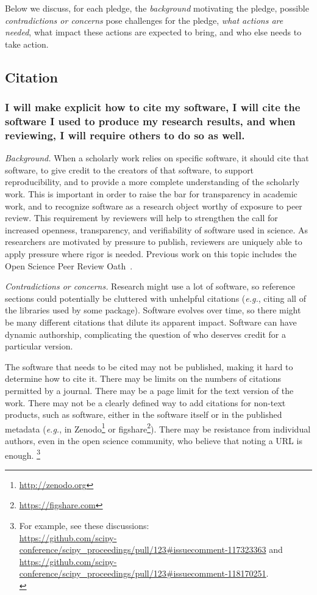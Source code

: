 \documentclass[a4paper,UKenglish]{dagman}
\renewcommand{\paragraph}[1]{\subsubsection*{#1}\xspace}
\newcommand{\eg}{\emph{e.g.},\xspace}
\begin{document}
Below we discuss, for each pledge, the \emph{background} motivating the pledge, possible \emph{contradictions or concerns} pose challenges for the pledge, \emph{what actions are needed}, what impact these actions are expected to bring, and who else needs to take action.


\subsection*{Citation}

\paragraph{I will make explicit how to cite my software, I will cite the software I used to produce my research results, and when reviewing, I will require others to do so as well.}

\emph{Background.} When a scholarly work relies on specific software, it should cite that software, to give credit to the creators of that software, to support reproducibility, and to provide a more complete understanding of the scholarly work.
This is important in order to raise the bar for transparency in academic work, and to recognize software as a research object worthy of exposure to peer review. This requirement by reviewers will help to strengthen the call for increased openness, transparency, and verifiability of software used in science. As researchers are motivated by pressure to publish, reviewers are uniquely able to apply pressure where rigor is needed. Previous work on this topic includes the Open Science Peer Review Oath~\cite{aleksic_open_2015}.

\emph{Contradictions or concerns.}
Research might use a lot of software, so reference sections could potentially be cluttered with unhelpful citations (\eg citing all of the libraries used by some package). 
Software evolves over time, so there might be many different citations that dilute its apparent impact. 
Software can have dynamic authorship, complicating the question of who deserves credit for a particular version. 

The software that needs to be cited may not be published, making it hard to determine how to cite it.  There may be limits on the numbers of citations permitted by a journal.  There may be a page limit for the text version of the work.  There may not be a clearly defined way to add citations for non-text products, such as software, either in the software itself or in the published metadata (\eg in Zenodo\footnote{\url{http://zenodo.org}} or figshare\footnote{\url{https://figshare.com}}).
There may be resistance from individual authors, even in the open science community, who believe that noting a URL is enough.%
\footnote{For example, see these discussions:\\
\url{https://github.com/scipy-conference/scipy_proceedings/pull/123\#issuecomment-117323363} and\\
\url{https://github.com/scipy-conference/scipy_proceedings/pull/123\#issuecomment-118170251}.\\
}
\end{document}
